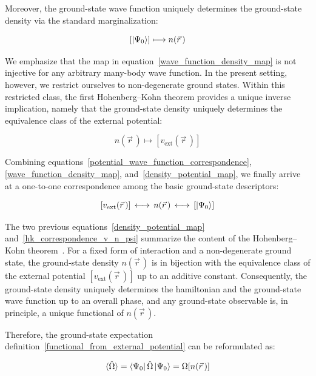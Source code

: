 Moreover, the ground-state wave function uniquely determines the ground-state density via the standard marginalization:

\begin{equation}
    \left[\ket{\Psi_0}\right]\longmapsto n(\vec{r}\,)
\label{wave_function_density_map}
\end{equation}

We emphasize that the map in equation~\eqref{wave_function_density_map} is not injective for any arbitrary many-body wave function.
In the present setting, however, we restrict ourselves to non-degenerate ground states. Within this restricted class, the first Hohenberg--Kohn theorem provides a unique inverse implication, namely that the ground-state density uniquely determines the equivalence class of the external potential:

\begin{equation}
    n(\vec{r}\,)\longmapsto\left[v_\mathrm{ext}(\vec{r}\,)\right]
\label{density_potential_map}
\end{equation}

Combining equations~\eqref{potential_wave_function_correspondence}, \eqref{wave_function_density_map},
and~\eqref{density_potential_map}, we finally arrive at a one-to-one correspondence among the basic ground-state descriptors:

\begin{equation}
    \left[v_\mathrm{ext}(\vec{r}\,)\right]\,\longleftrightarrow\, n(\vec{r}\,)\,\longleftrightarrow\,\left[\ket{\Psi_0}\right]
\label{hk_correspondence_v_n_psi}
\end{equation}

The two previous equations~\eqref{density_potential_map} and~\eqref{hk_correspondence_v_n_psi} summarize the content of the Hohenberg--Kohn theorem~\cite{hohenberg1964inhomogeneous,burke2012perspective}.
For a fixed form of interaction and a non-degenerate ground state, the ground-state density $n(\vec{r}\,)$ is in bijection with the equivalence class of the external potential $\left[v_\mathrm{ext}(\vec{r}\,)\right]$ up to an additive constant. 
Consequently, the ground-state density uniquely determines the hamiltonian and the ground-state wave function up to an overall phase,
and any ground-state observable is, in principle, a unique functional of $n(\vec{r}\,)$.

Therefore, the ground-state expectation definition~\eqref{functional_from_external_potential} can be reformulated as:

\begin{equation}
   \braket{\hat{\Omega}}= \bra{\Psi_0}\hat{\Omega}\ket{\Psi_0}=\Omega[n(\vec{r}\,)]
\label{functional_from_density}
\end{equation}

